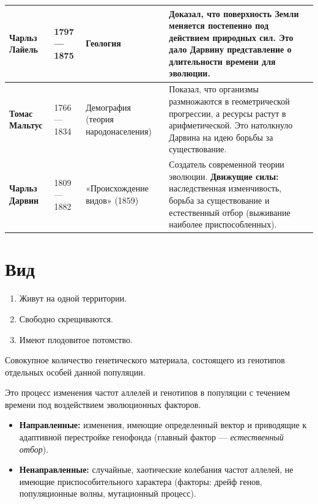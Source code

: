 \documentclass[12pt]{article}
\begin{document}
\begin{xltabular}{\textwidth}{|p{3cm}|p{2.5cm}|>{\raggedright\arraybackslash}X|>{\raggedright\arraybackslash}X|}
		\textbf{Чарльз Лайель} & 1797—1875 & Геология & Доказал, что поверхность Земли меняется постепенно под действием природных сил. Это дало Дарвину представление о длительности времени для эволюции.\\
		\hline
		
		\textbf{Томас Мальтус} & 1766—1834 & Демография (теория народонаселения) & Показал, что организмы размножаются в геометрической прогрессии, а ресурсы растут в арифметической. Это натолкнуло Дарвина на идею борьбы за существование.\\
		\hline
		
		\textbf{Чарльз Дарвин} & 1809—1882 & «Происхождение видов» (1859) & Создатель современной теории эволюции. \newline \textbf{Движущие силы:} наследственная изменчивость, борьба за существование и естественный отбор (выживание наиболее приспособленных).\\
		\hline
		
	\end{xltabular}
	
	\section{Вид}
	
	\begin{enumerate}
		\item Живут на одной территории.
		\item Свободно скрещиваются.
		\item Имеют плодовитое потомство.
	\end{enumerate}
	
	\begin{definition}
		Совокупное количество генетического материала, состоящего из генотипов отдельных особей данной популяции.
	\end{definition}
	
	\begin{definition}
		Это процесс изменения частот аллелей и генотипов в популяции с течением времени под воздействием эволюционных факторов.
		\begin{itemize}
			\item \textbf{Направленные:} изменения, имеющие определенный вектор и приводящие к адаптивной перестройке генофонда (главный фактор — \textit{естественный отбор}).
			\item \textbf{Ненаправленные:} случайные, хаотические колебания частот аллелей, не имеющие приспособительного характера (факторы: дрейф генов, популяционные волны, мутационный процесс).
		\end{itemize}
	\end{definition}
	
\end{document}
